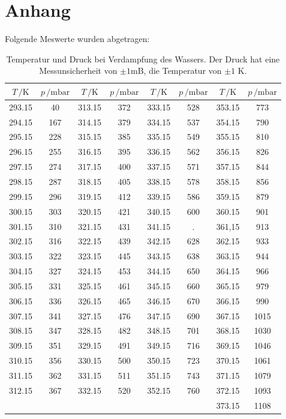 \newpage
\section{Anhang}
Folgende Meswerte wurden abgetragen:
\begin{table}[H]
    \centering
    \caption{Temperatur und Druck bei Verdampfung des Wassers. Der Druck hat eine Messunsicherheit von
    $\pm1$mB, die Temperatur von $\pm 1$ K.}
    \label{tab:Messreihe_1}
  \begin{tabular}{
    c c||c c||c c||c c
  }
  \toprule 
  $T\,/ \unit{\kelvin}$ & $p\,/ \text{mbar}$ & $T\,/ \unit{\kelvin}$ & $p\,/ \text{mbar}$&
  $T\,/ \unit{\kelvin}$ & $p\,/ \text{mbar}$ & $T\,/ \unit{\kelvin}$ & $p\,/ \text{mbar}$\\
  \midrule
  293.15  & 40   & 313.15  & 372  & 333.15  & 528  & 353.15  & 773 \\
  294.15  & 167  & 314.15  & 379  & 334.15  & 537  & 354.15  & 790 \\
  295.15  & 228  & 315.15  & 385  & 335.15  & 549  & 355.15  & 810 \\
  296.15  & 255  & 316.15  & 395  & 336.15  & 562  & 356.15  & 826 \\
  297.15  & 274  & 317.15  & 400  & 337.15  & 571  & 357.15  & 844 \\
  298.15  & 287  & 318.15  & 405  & 338.15  & 578  & 358.15  & 856 \\
  299.15  & 296  & 319.15  & 412  & 339.15  & 586  & 359.15  & 879 \\
  300.15  & 303  & 320.15  & 421  & 340.15  & 600  & 360.15  & 901 \\
  301.15  & 310  & 321.15  & 431  & 341.15  & \text{--} .& 361,15  & 913 \\
  302.15  & 316  & 322.15  & 439  & 342.15  & 628  & 362.15  & 933 \\
  303.15  & 322  & 323.15  & 445  & 343.15  & 638  & 363.15  & 944 \\
  304.15  & 327  & 324.15  & 453  & 344.15  & 650  & 364.15  & 966 \\
  305.15  & 331  & 325.15  & 461  & 345.15  & 660  & 365.15  & 979 \\
  306.15  & 336  & 326.15  & 465  & 346.15  & 670  & 366.15  & 990 \\
  307.15  & 341  & 327.15  & 476  & 347.15  & 690  & 367.15  & 1015\\
  308.15  & 347  & 328.15  & 482  & 348.15  & 701  & 368.15  & 1030\\
  309.15  & 351  & 329.15  & 491  & 349.15  & 716  & 369.15  & 1046\\
  310.15  & 356  & 330.15  & 500  & 350.15  & 723  & 370.15  & 1061\\
  311.15  & 362  & 331.15  & 511  & 351.15  & 743  & 371.15  & 1079\\
  312.15  & 367  & 332.15  & 520  & 352.15  & 760  & 372.15  & 1093\\
        &   &       &       &       &      & 373.15  & 1108 \\
  \bottomrule
  \end{tabular}
  \end{table}
